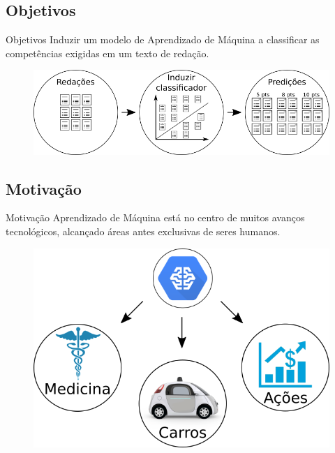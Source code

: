 \documentclass[10pt]{beamer}
\begin{document}
  \subsection{Objetivos}
    \begin{frame}[fragile]{Objetivos}
    Induzir um modelo de Aprendizado de Máquina a classificar as competências exigidas em um texto de redação.

    \begin{figure}[H]
    \begin{center}
        \includegraphics[scale=0.50]{images/automatic_essay_system.png}
    \end{center}
    \end{figure}
    \end{frame}

  \subsection{Motivação}
    \begin{frame}[fragile]{Motivação}
    Aprendizado de Máquina está no centro de muitos avanços tecnológicos, alcançado áreas antes exclusivas de seres humanos.
    \begin{figure}[H]
    \begin{center}
        \includegraphics[scale=0.50]{images/machine_learn.png}
    \end{center}
    \end{figure}
    \end{frame}
\end{document}
